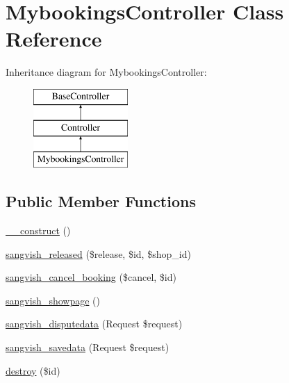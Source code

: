 \hypertarget{class_responsive_1_1_http_1_1_controllers_1_1_mybookings_controller}{}\section{Mybookings\+Controller Class Reference}
\label{class_responsive_1_1_http_1_1_controllers_1_1_mybookings_controller}
Inheritance diagram for Mybookings\+Controller\+:\begin{figure}[H]
\begin{center}
\leavevmode
\includegraphics[height=3.000000cm]{class_responsive_1_1_http_1_1_controllers_1_1_mybookings_controller}
\end{center}
\end{figure}
\subsection*{Public Member Functions}
\begin{DoxyCompactItemize}
\item 
\mbox{\hyperlink{class_responsive_1_1_http_1_1_controllers_1_1_mybookings_controller_a095c5d389db211932136b53f25f39685}{\+\_\+\+\_\+construct}} ()
\item 
\mbox{\hyperlink{class_responsive_1_1_http_1_1_controllers_1_1_mybookings_controller_a07f43d29a009cc3613f38ab786816452}{sangvish\+\_\+released}} (\$release, \$id, \$shop\+\_\+id)
\item 
\mbox{\hyperlink{class_responsive_1_1_http_1_1_controllers_1_1_mybookings_controller_a25df322fe0784c7faca06e40cac3b5af}{sangvish\+\_\+cancel\+\_\+booking}} (\$cancel, \$id)
\item 
\mbox{\hyperlink{class_responsive_1_1_http_1_1_controllers_1_1_mybookings_controller_ae5a8b5289e68974315c61e6e9f0e6494}{sangvish\+\_\+showpage}} ()
\item 
\mbox{\hyperlink{class_responsive_1_1_http_1_1_controllers_1_1_mybookings_controller_a862f15132adf631831019d0565260396}{sangvish\+\_\+disputedata}} (Request \$request)
\item 
\mbox{\hyperlink{class_responsive_1_1_http_1_1_controllers_1_1_mybookings_controller_a63d8d498a130e9f530dd9de0247a0c74}{sangvish\+\_\+savedata}} (Request \$request)
\item 
\mbox{\hyperlink{class_responsive_1_1_http_1_1_controllers_1_1_mybookings_controller_a726fa8a4b4b187b9ca32ba427aac8137}{destroy}} (\$id)
\end{DoxyCompactItemize}


